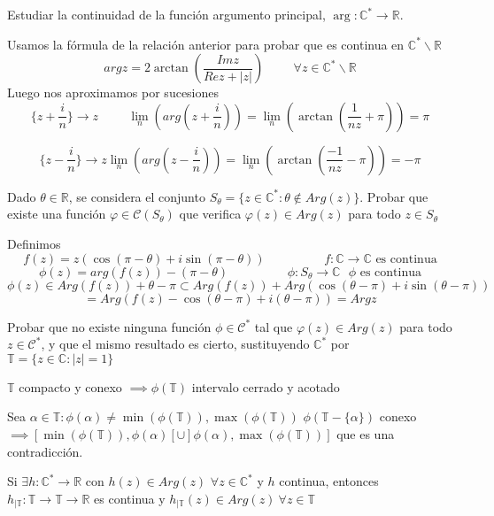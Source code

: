 \begin{ejer}
	Estudiar la continuidad de la función argumento principal, $\arg : \mathbb{C}^{\ast} \rightarrow \mathbb{R}$.
\end{ejer}

\begin{sol}


Usamos la fórmula de la relación anterior para probar que es continua en $\mathbb{C}^{\ast} \backslash \mathbb{R}$
$$  
arg z = 2\arctan (\frac{Imz}{Rez + |z|}) \hspace{1cm} \forall z\in\mathbb{C}^{\ast}\backslash\mathbb{R}
$$
Luego nos aproximamos por sucesiones
$$  
\{ z+\frac{i}{n} \} \rightarrow z \hspace{1cm}
\lim_n(arg(z+\frac{i}{n})) = \lim_n( \arctan(\frac{1}{nz}+\pi) ) = \pi
$$

$$
\{ z-\frac{i}{n} \} \rightarrow z
\lim_n(arg(z-\frac{i}{n})) = \lim_n( \arctan(\frac{-1}{nz}-\pi) ) = -\pi
$$
\end{sol}

\begin{ejer}
	Dado $\theta\in\mathbb{R}$, se considera el conjunto $S_{\theta} = \{ z\in\mathbb{C}^{\ast} : \theta\not\in Arg(z) \}$. 
	Probar que existe una función $\varphi\in\mathcal{C}(S_{\theta})$ que verifica $\varphi(z)\in Arg(z)$ para todo $z\in S_{\theta}$
\end{ejer}

\begin{sol}
Definimos
$$
f(z) = z( \cos(\pi-\theta) + i\sin(\pi-\theta) ) \hspace{2cm} f:\mathbb{C}\rightarrow \mathbb{C} \text{ es continua}
$$
$$
\phi(z) = arg(f(z)) - (\pi-\theta) \hspace{2cm} \phi: S_{\theta} \rightarrow \mathbb{C} \text{ $\phi$ es continua}
$$
$$ 
\phi(z) \in Arg (f(z)) + \theta-\pi \subset Arg (f(z)) + Arg( \cos(\theta-\pi)+i\sin(\theta-\pi) ) 
$$
$$= Arg ( f(z)-\cos(\theta-\pi)+i(\theta-\pi) ) = Argz
$$
\end{sol}

\begin{ejer}
	Probar que no existe ninguna función $\phi\in\mathcal{C}^{\ast}$ tal que $\varphi(z)\in Arg(z)$ para todo $z\in\mathcal{C}^{\ast}$, y que el mismo resultado es cierto, sustituyendo $\mathbb{C}^{\ast}$ por $\mathbb{T}=\{ z\in\mathbb{C} : |z|=1 \}$
\end{ejer}

\begin{sol}
$\mathbb{T}$ compacto y conexo $\implies \phi(\mathbb{T})$ intervalo cerrado y acotado

Sea $\alpha\in\mathbb{T} : \phi(\alpha) \not =\min(\phi(\mathbb{T})), \max(\phi(\mathbb{T}))$ 
$\phi ( \mathbb{T}-\{ \alpha \} )$ conexo $\implies [ \min(\phi(\mathbb{T})), \phi(\alpha)[ \cup ]\phi(\alpha), \max( \phi(\mathbb{T}) ) ] $ que es una contradicción.

Si $\exists h:\mathbb{C}^{\ast} \rightarrow \mathbb{R}$ con $h(z)\in Arg(z)$ $\forall z\in\mathbb{C}^{\ast}$ y $h$ continua, entonces
$h_{| \mathbb{T}} : \mathbb{T} \rightarrow \mathbb{T} \rightarrow \mathbb{R}$ es continua y $h_{|\mathbb{T}} (z) \in Arg(z) \ \forall z\in\mathbb{T}$
\end{sol}

